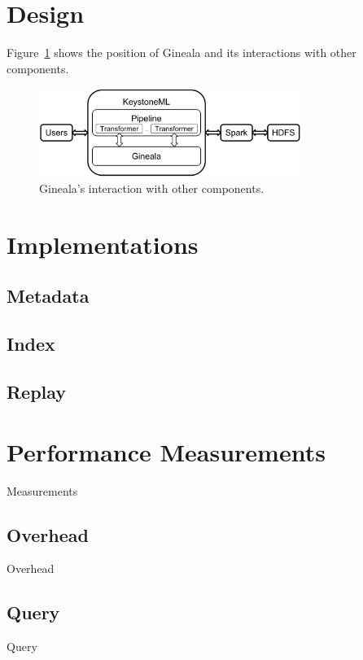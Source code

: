 \documentclass{sig-alternate}
\begin{document}
\section{Design}
\label{sec:Design}
Figure~\ref{fig:architecture} shows the position of Gineala and its interactions with other components.
\begin{figure}[h]
\begin{center}
    \includegraphics[width=85mm]{pictures/architecture}
\caption {Gineala's interaction with other components.
    \label{fig:architecture}
}
\end{center}
\end{figure}

\section{Implementations}
\label{sec:Impl}

\subsection{Metadata}

\subsection{Index}

\subsection{Replay}

\section{Performance Measurements}
\label{sec:Perf}
Measurements

\subsection{Overhead}
Overhead

\subsection{Query}
Query
\end{document}
